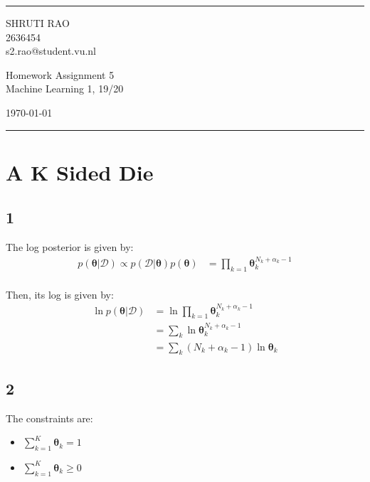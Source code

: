 \documentclass[a4paper]{article}
\begin{document}

\fancyhead[C]{}
\hrule \medskip %
\begin{minipage}{0.295\textwidth} 
\raggedright
\footnotesize
SHRUTI RAO \hfill\\   
2636454 \hfill\\
s2.rao@student.vu.nl
\end{minipage}
\begin{minipage}{0.4\textwidth} 
\centering 
\large 
Homework Assignment 5\\ 
\normalsize 
Machine Learning 1, 19/20\\ 
\end{minipage}
\begin{minipage}{0.295\textwidth} 
\raggedleft
\today\hfill\\
\end{minipage}
\medskip\hrule 
\bigskip


\section*{A K Sided Die}
\subsection*{1}
The log posterior is given by:
\begin{align*}
    p(\pmb{\theta}|\mathcal{D}) \propto p(\mathcal{D}|\pmb{\theta})p(\pmb{\theta}) &= \prod_{k=1}\pmb{\theta}_{k}^{N_{k} + \alpha_{k} -1} \\
\end{align*}{}

Then, its log is given by:
\begin{align*}
    \ln{p(\pmb{\theta}|\mathcal{D})} &= \ln{\prod_{k=1}\pmb{\theta}_{k}^{N_{k} + \alpha_{k} -1}} \\
    &= \sum_{k}\ln{\pmb{\theta}_{k}^{N_{k} + \alpha_{k} -1}}\\
    &= \sum_{k}(N_{k} + \alpha_{k} -1)\ln{\pmb{\theta}_{k}}
\end{align*}

\subsection*{2}
The constraints are:
\begin{itemize}
    \item $\sum_{k=1}^{K}\pmb{\theta}_{k}=1$
    \item $\sum_{k=1}^{K}\pmb{\theta}_{k} \geq 0$
\end{itemize}
\end{document}
